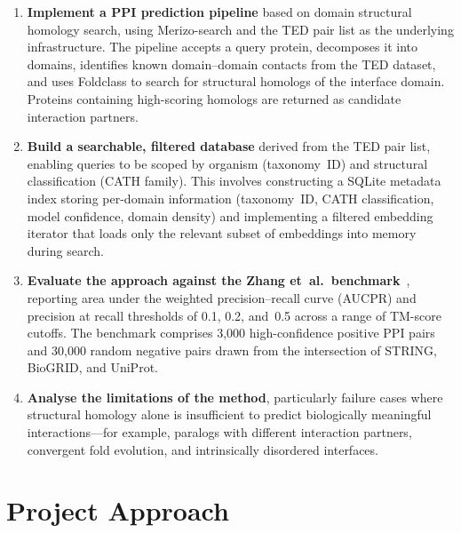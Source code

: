 \begin{enumerate}
    \item \textbf{Implement a PPI prediction pipeline} based on domain structural homology search, using Merizo-search and the TED pair list as the underlying infrastructure. The pipeline accepts a query protein, decomposes it into domains, identifies known domain--domain contacts from the TED dataset, and uses Foldclass to search for structural homologs of the interface domain. Proteins containing high-scoring homologs are returned as candidate interaction partners.

    \item \textbf{Build a searchable, filtered database} derived from the TED pair list, enabling queries to be scoped by organism (taxonomy~ID) and structural classification (CATH family). This involves constructing a SQLite metadata index storing per-domain information (taxonomy~ID, CATH classification, model confidence, domain density) and implementing a filtered embedding iterator that loads only the relevant subset of embeddings into memory during search.

    \item \textbf{Evaluate the approach against the Zhang et~al.\ benchmark}~\cite{zhang2025ppi}, reporting area under the weighted precision--recall curve (AUCPR) and precision at recall thresholds of 0.1, 0.2, and~0.5 across a range of TM-score cutoffs. The benchmark comprises 3{,}000 high-confidence positive PPI pairs and 30{,}000 random negative pairs drawn from the intersection of STRING, BioGRID, and UniProt.

    \item \textbf{Analyse the limitations of the method}, particularly failure cases where structural homology alone is insufficient to predict biologically meaningful interactions---for example, paralogs with different interaction partners, convergent fold evolution, and intrinsically disordered interfaces.
\end{enumerate}


\section{Project Approach}
\label{sec:project-approach}

